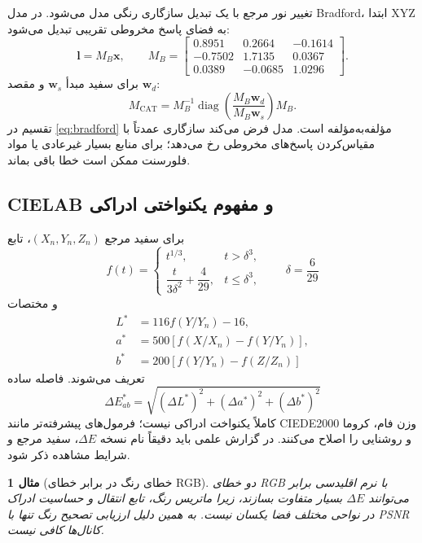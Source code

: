 \documentclass[12pt,openany,oneside]{book}
\newtheorem{example}{مثال}[chapter]
\newcommand{\vect}[1]{\bm{#1}}
\newcommand{\diag}{\operatorname{diag}}
\begin{document}
تغییر نور مرجع با یک تبدیل سازگاری رنگی مدل می‌شود. در مدل Bradford، ابتدا XYZ به فضای پاسخ
مخروطی تقریبی تبدیل می‌شود:
\begin{equation}
\vect l=M_B\vect x,
\qquad
M_B=\begin{bmatrix}
0.8951&0.2664&-0.1614\\
-0.7502&1.7135&0.0367\\
0.0389&-0.0685&1.0296
\end{bmatrix}.
\end{equation}
برای سفید مبدأ \(\vect w_s\) و مقصد \(\vect w_d\):
\begin{equation}
M_{\mathrm{CAT}}=M_B^{-1}
\diag\!\left(\frac{M_B\vect w_d}{M_B\vect w_s}\right)M_B.
\label{eq:bradford}
\end{equation}
تقسیم در \eqref{eq:bradford} مؤلفه‌به‌مؤلفه است. مدل فرض می‌کند سازگاری عمدتاً با مقیاس‌کردن
پاسخ‌های مخروطی رخ می‌دهد؛ برای منابع بسیار غیرعادی یا مواد فلورسنت ممکن است خطا باقی بماند.

\subsection{CIELAB و مفهوم یکنواختی ادراکی}

برای سفید مرجع \((X_n,Y_n,Z_n)\)، تابع
\begin{equation}
f(t)=\begin{cases}
t^{1/3},&t>\delta^3,\\
\dfrac{t}{3\delta^2}+\dfrac{4}{29},&t\le\delta^3,
\end{cases}
\qquad \delta=\frac6{29}
\end{equation}
و مختصات
\begin{align}
L^*&=116f(Y/Y_n)-16,\\
a^*&=500[f(X/X_n)-f(Y/Y_n)],\\
b^*&=200[f(Y/Y_n)-f(Z/Z_n)]
\end{align}
تعریف می‌شوند. فاصله ساده
\begin{equation}
\Delta E_{ab}^*=\sqrt{(\Delta L^*)^2+(\Delta a^*)^2+(\Delta b^*)^2}
\end{equation}
کاملاً یکنواخت ادراکی نیست؛ فرمول‌های پیشرفته‌تر مانند CIEDE2000 وزن فام، کروما و روشنایی را
اصلاح می‌کنند. در گزارش علمی باید دقیقاً نام نسخه \(\Delta E\)، سفید مرجع و شرایط مشاهده ذکر شود.

\begin{example}[خطای رنگ در برابر خطای RGB]
دو خطای RGB با نرم اقلیدسی برابر می‌توانند \(\Delta E\) بسیار متفاوت بسازند، زیرا ماتریس رنگ،
تابع انتقال و حساسیت ادراک در نواحی مختلف فضا یکسان نیست. به همین دلیل ارزیابی تصحیح رنگ تنها با
PSNR کانال‌ها کافی نیست.
\end{example}
\end{document}
